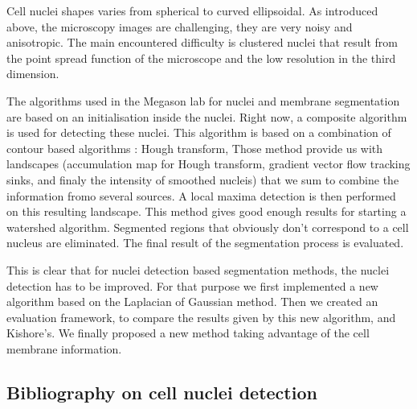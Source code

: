 Cell nuclei shapes varies from spherical to curved ellipsoidal. As introduced above, the microscopy images are challenging, they are very noisy and anisotropic.
The main encountered difficulty is clustered nuclei that result from the point spread function of the microscope and the low resolution in the third dimension.

The algorithms used in the Megason lab for nuclei and membrane segmentation are based on an initialisation inside the nuclei.
Right now, a composite algorithm is used for detecting these nuclei. This algorithm is based on a combination of contour based algorithms :
Hough transform, 
Those method provide us with landscapes (accumulation map for Hough transform, gradient vector flow tracking sinks, and finaly the intensity of smoothed nucleis) that we sum to combine the information fromo several sources. A local maxima detection is then performed on this resulting landscape.
This method gives good enough results for starting a watershed algorithm. Segmented regions that obviously don't correspond to a cell nucleus are eliminated. The final result of the segmentation process is evaluated.


This is clear that for nuclei detection based segmentation methods, the nuclei detection has to be improved.
For that purpose we first implemented a new algorithm based on the Laplacian of Gaussian method.
Then we created an evaluation framework, to compare the results given by this new algorithm, and Kishore's.
We finally proposed a new method taking advantage of the cell membrane information.



\subsection{Bibliography on cell nuclei detection}

